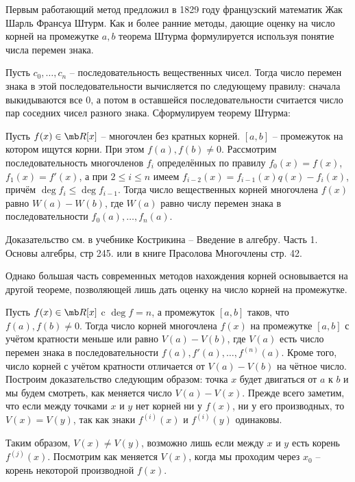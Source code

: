 Первым работающий метод предложил в 1829 году французский математик Жак Шарль Франсуа Штурм. Как и более ранние методы, дающие оценку на число корней на промежутке $a,b$ теорема Штурма формулируется используя понятие числа перемен знака.

\dfn Пусть $c_0,\dots,c_n$ -- последовательность вещественных чисел. Тогда число  перемен знака в этой последовательности вычисляется по следующему правилу: сначала выкидываются все 0, а потом в оставшейся последовательности считается число пар соседних чисел разного знака.
\edfn
\noindent Сформулируем теорему Штурма:

\begin{thmm}[Штурм] Пусть $f(x) \in \mb R[x]$ -- многочлен без кратных корней. $[a,b]$ -- промежуток на котором ищутся корни. При этом $f(a),f(b)\neq 0$. Рассмотрим последовательность многочленов $f_i$ определённых по правилу $f_0(x)=f(x)$, $f_1(x)=f'(x)$, а при $2\leq i\leq n$ имеем $f_{i-2}(x)=f_{i-1}(x)q(x)-f_i(x)$, причём $\deg f_i \leq \deg f_{i-1}$. Тогда число вещественных корней многочлена $f(x)$ равно $W(a)-W(b)$, где $W(a)$ равно числу перемен знака в последовательности $f_0(a),\dots,f_n(a)$. 
\end{thmm}

Доказательство см. в учебнике Кострикина -- Введение в алгебру. Часть 1. Основы алгебры, стр 245. или в книге Прасолова Многочлены стр. 42.

Однако большая часть современных методов нахождения корней основывается на другой теореме, позволяющей лишь дать оценку на число корней на промежутке. 

 Пусть $f(x)\in \mb R[x]$ c $\deg f=n$, а промежуток $[a,b]$ таков, что $f(a),f(b)\neq 0$. Тогда число корней многочлена $f(x)$ на промежутке $[a,b]$ с учётом кратности меньше или равно $V(a)-V(b)$, где $V(a)$ есть число перемен знака в последовательности $f(a),f'(a),\dots,f^{(n)}(a)$. Кроме того, число корней с учётом кратности отличается от $V(a)-V(b)$ на чётное число.
\ethrm
\proof Построим доказательство следующим образом: точка  $x$  будет двигаться от $a$ к $b$ и мы будем смотреть, как меняется число $V(a)-V(x)$. Прежде всего заметим, что если между точками  $x$  и $y$ нет корней ни у $f(x)$, ни у его производных, то $V(x)=V(y)$, так как знаки $f^{(i)}(x)$ и $f^{(i)}(y)$ одинаковы.

Таким образом, $V(x)\neq V(y)$, возможно лишь если между $x$ и $y$ есть корень $f^{(j)}(x)$. Посмотрим как меняется $V(x)$, когда мы проходим  через $x_0$ -- корень некоторой производной $f(x)$. 

